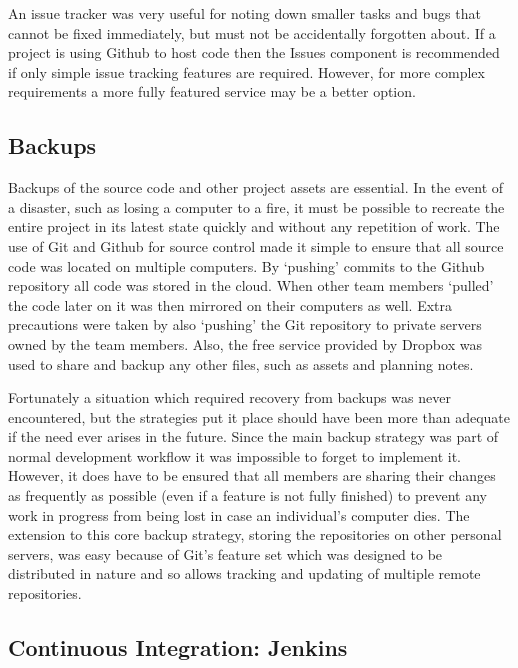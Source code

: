 An issue tracker was very useful for noting down smaller tasks and bugs that cannot be fixed immediately,
but must not be accidentally forgotten about. If a project is using Github to host code then the
Issues component is recommended if only simple issue tracking features are required. However, for
more complex requirements a more fully featured service may be a better option.

\subsection{Backups}

Backups of the source code and other project assets are essential. In the event of a
disaster, such as losing a computer to a fire, it must be possible to recreate the
entire project in its latest state quickly and without any repetition of work.
The use of Git and Github for source control made it simple to ensure that all
source code was located on multiple computers. By `pushing' commits to the Github
repository all code was stored in the cloud. When other team members `pulled' the code
later on it was then mirrored on their computers as well. Extra precautions were taken
by also `pushing' the Git repository to private servers owned by the team members.
Also, the free service provided by Dropbox
was used to share and backup any other files, such as assets and planning notes.

Fortunately a situation which required recovery from backups was never encountered,
but the strategies put it place should have been more than adequate if the need ever
arises in the future. Since the main backup strategy was part of normal development
workflow it was impossible to forget to implement it. However, it does have to be ensured that
all members are sharing their changes as frequently as possible (even if a feature is
not fully finished) to prevent any work in progress from being lost in case an individual's
computer dies. The extension to this core backup strategy, storing the repositories
on other personal servers, was easy because of Git's feature set which was designed
to be distributed in nature and so allows tracking and updating of multiple remote repositories.

\subsection{Continuous Integration: Jenkins}

